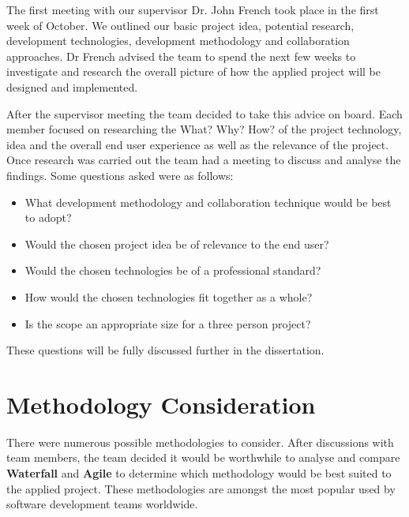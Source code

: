 The first meeting with our supervisor Dr. John French took place in the first week of October. We outlined our basic project idea, potential research, development technologies, development methodology and collaboration approaches. Dr French advised the team  to spend the next few weeks to investigate and research the overall picture of how the applied project will be designed and implemented.


\vspace{5mm} %

After the supervisor meeting the team decided to take this advice on board. Each member focused on researching the What? Why? How? of the project technology, idea and the overall end user experience as well as the relevance of the project. Once research was carried out the team had a meeting to discuss and  analyse the findings. Some questions asked were as follows:

\begin{itemize}

    \item {What development methodology and collaboration technique would be best to adopt?}

    \item{Would the chosen project idea be of relevance to the end user?}

     \item{Would the chosen technologies be of a professional standard?}

    \item{How would the chosen technologies fit together as a whole?}

    \item{Is the scope an appropriate size for a three person project?}

\end{itemize}

These questions will be fully discussed further in the dissertation.

\section{Methodology Consideration}
There were numerous possible methodologies to consider. After discussions with team members, the team decided it would be worthwhile to analyse and compare \textbf{Waterfall} and \textbf{Agile} to determine which methodology would be best suited to the applied project. These methodologies are amongst the most popular used by software development teams worldwide.
\vspace{5mm} %


